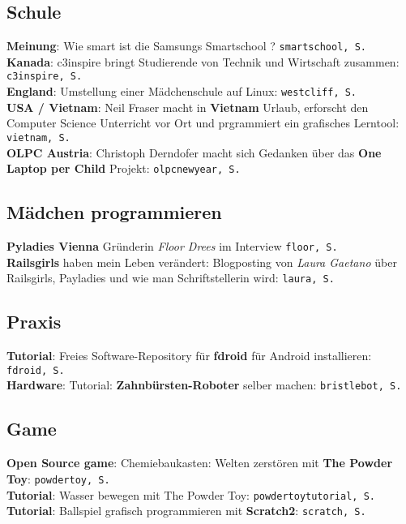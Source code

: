 \subsection*{Schule}

\textbf{Meinung}: Wie smart ist die Samsungs Smartschool ? \texttt{smartschool, S. \pageref{smartschool}}\\
\textbf{Kanada}: c3inspire bringt Studierende von Technik und Wirtschaft zusammen: \texttt{c3inspire, S. \pageref{c3inspire}}\\
\textbf{England}: Umstellung einer Mädchenschule auf Linux: \texttt{westcliff, S. \pageref{westcliff}}\\
\textbf{USA / Vietnam}: Neil Fraser macht in \textbf{Vietnam} Urlaub, erforscht den Computer Science Unterricht vor Ort und prgrammiert ein grafisches Lerntool: \texttt{vietnam, S. \pageref{vietnam}}\\ 
\textbf{OLPC Austria}: Christoph Derndofer macht sich Gedanken über das \textbf{One Laptop per Child} Projekt: \texttt{olpcnewyear, S. \pageref{olpcnewyear}}\\

\subsection*{Mädchen programmieren}

\textbf{Pyladies Vienna} Gründerin \textit{Floor Drees} im Interview \texttt{floor, S. \pageref{floor}}\\
\textbf{Railsgirls} haben mein Leben verändert: Blogposting von \textit{Laura Gaetano} über Railsgirls, Payladies und wie man Schriftstellerin wird: \texttt{laura, S.\pageref{laura}}\\

\subsection*{Praxis}

\textbf{Tutorial}: Freies Software-Repository für \textbf{fdroid} für Android installieren: \texttt{fdroid, S. \pageref{fdroid}}\\ \textbf{Hardware}: Tutorial: \textbf{Zahnbürsten-Roboter} selber machen: \texttt{bristlebot, S. \pageref{bristlebot}}\\

\subsection*{Game}

\textbf{Open Source game}: Chemiebaukasten: Welten zerstören mit \textbf{The Powder Toy}: \texttt{powdertoy, S. \pageref{powdertoy}}\\
\textbf{Tutorial}: Wasser bewegen mit The Powder Toy: \texttt{powdertoytutorial, S. \pageref{powdertoytutorial}}\\
\textbf{Tutorial}: Ballspiel grafisch programmieren mit \textbf{Scratch2}: \texttt{scratch, S. \pageref{scratch}}\\
